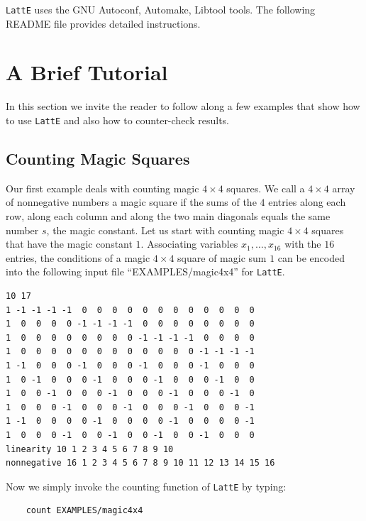 \documentclass{article}
\newcommand{\latte}{{\tt LattE}\xspace}
\begin{document}


\latte uses the GNU Autoconf, Automake, Libtool tools. %
The following README file provides detailed instructions.

{\small}


\section{A Brief Tutorial}
In this section we invite the reader to follow along a few examples
that show how to use {\tt LattE} and also how to counter-check
results.

\subsection{Counting Magic Squares}
Our first example deals with counting magic $4\times 4$ squares. We 
call a $4\times 4$ array of nonnegative numbers a magic square if the
sums of the $4$ entries along each row, along each column and along
the two main diagonals equals the same number $s$, the magic
constant. Let us start with counting magic $4\times 4$ squares that
have the magic constant $1$. Associating variables $x_1,\ldots,x_{16}$ with
the $16$ entries, the conditions of a magic $4\times 4$ square of
magic sum $1$ can be encoded into the following input file
``EXAMPLES/magic4x4'' for {\tt LattE}.
\begin{verbatim}
10 17
1 -1 -1 -1 -1  0  0  0  0  0  0  0  0  0  0  0  0
1  0  0  0  0 -1 -1 -1 -1  0  0  0  0  0  0  0  0
1  0  0  0  0  0  0  0  0 -1 -1 -1 -1  0  0  0  0
1  0  0  0  0  0  0  0  0  0  0  0  0 -1 -1 -1 -1
1 -1  0  0  0 -1  0  0  0 -1  0  0  0 -1  0  0  0
1  0 -1  0  0  0 -1  0  0  0 -1  0  0  0 -1  0  0
1  0  0 -1  0  0  0 -1  0  0  0 -1  0  0  0 -1  0
1  0  0  0 -1  0  0  0 -1  0  0  0 -1  0  0  0 -1
1 -1  0  0  0  0 -1  0  0  0  0 -1  0  0  0  0 -1
1  0  0  0 -1  0  0 -1  0  0 -1  0  0 -1  0  0  0
linearity 10 1 2 3 4 5 6 7 8 9 10
nonnegative 16 1 2 3 4 5 6 7 8 9 10 11 12 13 14 15 16
\end{verbatim}
Now we simply invoke the counting function of {\tt LattE} by typing:
\begin{verbatim}
    count EXAMPLES/magic4x4
\end{verbatim}
\end{document}
